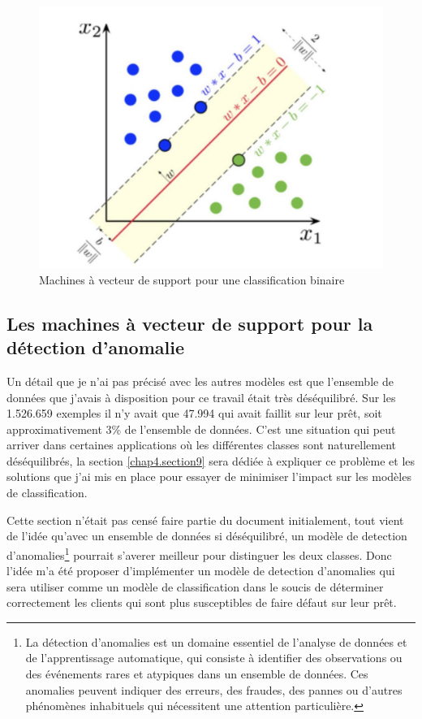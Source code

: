 \begin{figure}
    \centering
    \includegraphics[width=0.75\linewidth]{images/SVM_margin.jpg}
    \caption{Machines à vecteur de support pour une classification binaire}
    \label{fig:fig11}
\end{figure}

\subsection{Les machines à vecteur de support pour la détection d'anomalie}
\label{chap4.sec8.sub1}
Un détail que je n'ai pas précisé avec les autres modèles est que l'ensemble de données que j'avais à disposition pour ce travail était très déséquilibré. Sur les 1.526.659 exemples il n'y avait que 47.994 qui avait faillit sur leur prêt, soit approximativement 3\% de l'ensemble de données. C'est une situation qui peut arriver dans certaines applications où les différentes classes sont naturellement déséquilibrés, la section \ref{chap4.section9} sera dédiée à expliquer ce problème et les solutions que j'ai mis en place pour essayer de minimiser l'impact sur les modèles de classification.

Cette section n'était pas censé faire partie du document initialement, tout vient de l'idée qu'avec un ensemble de données si déséquilibré, un modèle de detection d'anomalies\footnote{La détection d'anomalies est un domaine essentiel de l'analyse de données et de l'apprentissage automatique, qui consiste à identifier des observations ou des événements rares et atypiques dans un ensemble de données. Ces anomalies peuvent indiquer des erreurs, des fraudes, des pannes ou d'autres phénomènes inhabituels qui nécessitent une attention particulière.} pourrait s'averer meilleur pour distinguer les deux classes. Donc l'idée m'a été proposer d'implémenter un modèle de detection d'anomalies qui sera utiliser comme un modèle de classification dans le soucis de déterminer correctement les clients qui sont plus susceptibles de faire défaut sur leur prêt.

